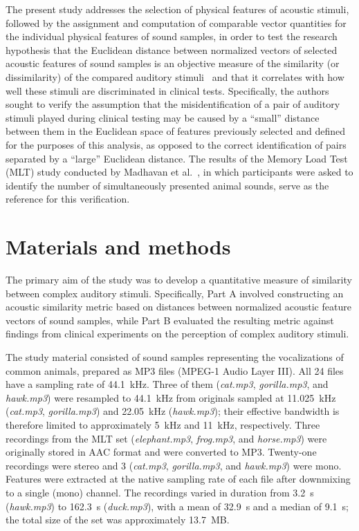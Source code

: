 \documentclass{article}
\begin{document}
The present study addresses the selection of physical features of acoustic stimuli, followed by the assignment and computation of comparable vector quantities for the individual physical features of sound samples, in order to test the research hypothesis that the Euclidean distance between normalized vectors of selected acoustic features of sound samples is an objective measure of the similarity (or dissimilarity) of the compared auditory stimuli~\cite{MadhavanWrobel2024MLT} and that it correlates with how well these stimuli are discriminated in clinical tests. Specifically, the authors sought to verify the assumption that the misidentification of a pair of auditory stimuli played during clinical testing may be caused by a ``small'' distance between them in the Euclidean space of features previously selected and defined for the purposes of this analysis, as opposed to the correct identification of pairs separated by a ``large'' Euclidean distance. The results of the Memory Load Test (MLT) study conducted by Madhavan et al.~\cite{MadhavanWrobel2024MLT}, in which participants were asked to identify the number of simultaneously presented animal sounds, serve as the reference for this verification.


\section{Materials and methods}
\label{section:mat_met}

The primary aim of the study was to develop a quantitative measure of similarity between complex auditory stimuli. Specifically, Part A involved constructing an acoustic similarity metric based on distances between normalized acoustic feature vectors of sound samples, while Part B evaluated the resulting metric against findings from clinical experiments on the perception of complex auditory stimuli.

The study material consisted of sound samples representing the vocalizations of common animals, prepared as MP3 files (MPEG-1 Audio Layer III). All 24 files have a sampling rate of 44.1~kHz. Three of them (\textit{cat.mp3}, \textit{gorilla.mp3}, and \textit{hawk.mp3}) were resampled to 44.1~kHz from originals sampled at 11.025~kHz (\textit{cat.mp3}, \textit{gorilla.mp3}) and 22.05~kHz (\textit{hawk.mp3}); their effective bandwidth is therefore limited to approximately 5~kHz and 11~kHz, respectively. Three recordings from the MLT set (\textit{elephant.mp3}, \textit{frog.mp3}, and \textit{horse.mp3}) were originally stored in AAC format and were converted to MP3. Twenty-one recordings were stereo and 3 (\textit{cat.mp3}, \textit{gorilla.mp3}, and \textit{hawk.mp3}) were mono. Features were extracted at the native sampling rate of each file after downmixing to a single (mono) channel. The recordings varied in duration from 3.2~s (\textit{hawk.mp3}) to 162.3~s (\textit{duck.mp3}), with a mean of 32.9~s and a median of 9.1~s; the total size of the set was approximately 13.7~MB.
\end{document}

